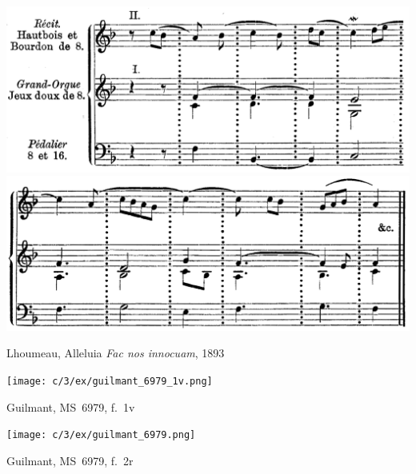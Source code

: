 \begin{example}
  \centering
  \includegraphics[width=.8\linewidth]{c/3/ex/lhoumeau_douze1.png}
  \\
  \includegraphics[width=.8\linewidth]{c/3/ex/lhoumeau_douze2.png}
  \caption{Lhoumeau, Alleluia \emph{Fac nos innocuam}, 1893}
  \label{mus:lhoumeau_facnos}
\end{example}

\vspace*{\fill}

\clearpage

\begin{landscape}

  \vspace*{\fill}

  \begin{example}
    \centering
    \texttt{[image: c/3/ex/guilmant\_6979\_1v.png]}
    \caption{Guilmant, \bnf{} MS~6979, f.~1v}
    \label{mus:guilmant_6979_1v}
  \end{example}

  \vspace*{\fill}

  \clearpage

  \vspace*{\fill}

  \begin{example}
    \centering
    \texttt{[image: c/3/ex/guilmant\_6979.png]}
    \caption{Guilmant, \bnf{} MS~6979, f.~2r}
    \label{mus:guilmant_6979}
  \end{example}

\vspace*{\fill}

\end{landscape}

